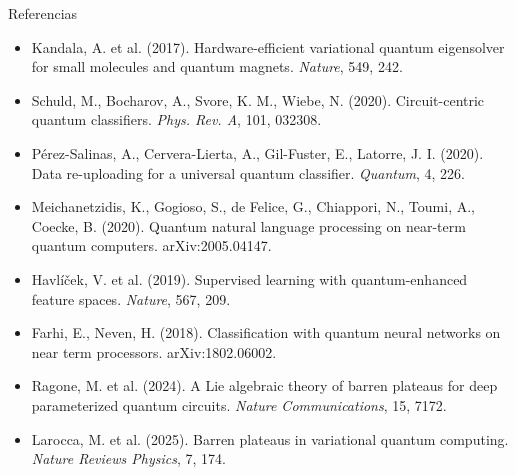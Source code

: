 \documentclass[aspectratio=169,10pt]{beamer}
\begin{document}
\begin{frame}{Referencias}
\scriptsize
\begin{itemize}
\item Kandala, A. et al. (2017). Hardware-efficient variational quantum eigensolver for small molecules and quantum magnets. \emph{Nature}, 549, 242.
\item Schuld, M., Bocharov, A., Svore, K. M., Wiebe, N. (2020). Circuit-centric quantum classifiers. \emph{Phys. Rev. A}, 101, 032308.
\item Pérez-Salinas, A., Cervera-Lierta, A., Gil-Fuster, E., Latorre, J. I. (2020). Data re-uploading for a universal quantum classifier. \emph{Quantum}, 4, 226.
\item Meichanetzidis, K., Gogioso, S., de Felice, G., Chiappori, N., Toumi, A., Coecke, B. (2020). Quantum natural language processing on near-term quantum computers. arXiv:2005.04147.
\item Havlíček, V. et al. (2019). Supervised learning with quantum-enhanced feature spaces. \emph{Nature}, 567, 209.
\item Farhi, E., Neven, H. (2018). Classification with quantum neural networks on near term processors. arXiv:1802.06002.
\item Ragone, M. et al. (2024). A Lie algebraic theory of barren plateaus for deep parameterized quantum circuits. \emph{Nature Communications}, 15, 7172.
\item Larocca, M. et al. (2025). Barren plateaus in variational quantum computing. \emph{Nature Reviews Physics}, 7, 174.
\end{itemize}
\end{frame}
\end{document}
